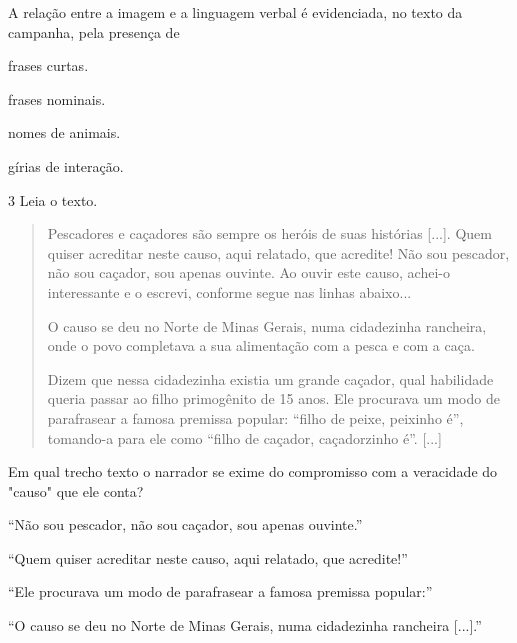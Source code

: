 A relação entre a imagem e a linguagem verbal é evidenciada, no texto da
campanha, pela presença de

\begin{escolha}
\item frases curtas.

\item frases nominais.

\item nomes de animais.

\item gírias de interação.
\end{escolha}

\num{3} Leia o texto.

\begin{quote}
Pescadores e caçadores são sempre os heróis de suas histórias {[}...{]}.
Quem quiser acreditar neste causo, aqui relatado, que acredite! Não sou
pescador, não sou caçador, sou apenas ouvinte. Ao ouvir este causo,
achei-o interessante e o escrevi, conforme segue nas linhas abaixo...

O causo se deu no Norte de Minas Gerais, numa cidadezinha rancheira,
onde o povo completava a sua alimentação com a pesca e com a caça.

Dizem que nessa cidadezinha existia um grande caçador, qual habilidade
queria passar ao filho primogênito de 15 anos. Ele procurava um modo de
parafrasear a famosa premissa popular: ``filho de peixe, peixinho é'',
tomando-a para ele como ``filho de caçador, caçadorzinho é''. {[}...{]}
\end{quote}


Em qual trecho texto o narrador se exime do compromisso com a veracidade
do "causo" que ele conta?

\begin{escolha}
\item ``Não sou pescador, não sou caçador, sou apenas ouvinte.''

\item ``Quem quiser acreditar neste causo, aqui relatado, que acredite!''

\item ``Ele procurava um modo de parafrasear a famosa premissa popular:''

\item ``O causo se deu no Norte de Minas Gerais, numa cidadezinha rancheira
{[}...{]}.''
\end{escolha}

